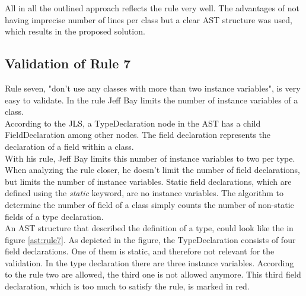 All in all the outlined approach reflects the rule very well. The advantages of not having imprecise number of lines per class but a clear \ac{AST} structure was used, which results in the proposed solution.

\subsection*{Validation of Rule 7}
Rule seven, "don’t use any classes with more than two instance variables", is very easy to validate. In the rule Jeff Bay limits the number of instance variables of a class. 
\\

According to the \ac{JLS}, a TypeDeclaration node in the \ac{AST} has  a child FieldDeclaration among other nodes. The field declaration represents the declaration of a field within a class. 
\\

With his rule, Jeff Bay limits this number of instance variables to two per type. When analyzing the rule closer, he doesn't limit the number of field declarations, but limits the number of instance variables. Static field declarations, which are defined using the \textit{static} keyword, are no instance variables. The algorithm to determine the number of field of a class simply counts the number of non-static fields of a type declaration. 
\\

An \ac{AST} structure that described the definition of a type, could look like the in figure \ref{ast:rule7}. As depicted in the figure, the TypeDeclaration consists of four field declarations. One of them is static, and therefore not relevant for the validation. In the type declaration there are three instance variables. According to the rule two are allowed, the third one is not allowed anymore. This third field declaration, which is too much to satisfy the rule, is marked in red.
\\

\label{ast:rule7}

